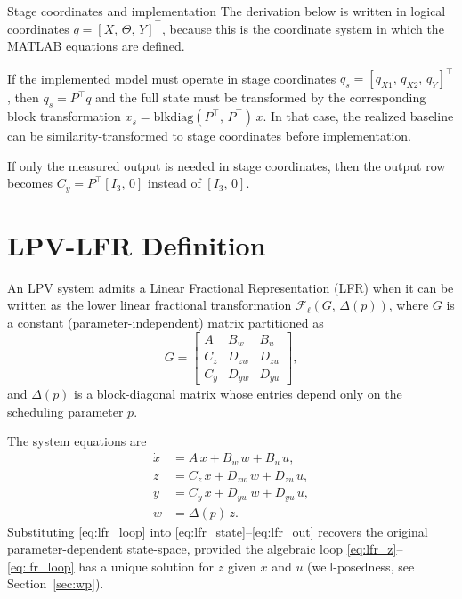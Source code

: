 \documentclass[11pt]{article}
\begin{document}
\begin{notebox}{Stage coordinates and implementation}
The derivation below is written in logical coordinates
$q = [X,\,\Theta,\,Y]^\top$, because this is the coordinate system in which the
MATLAB equations are defined.

If the implemented model must operate in stage coordinates
$q_s = [q_{X1},\,q_{X2},\,q_Y]^\top$, then $q_s = P^\top q$ and the full state
must be transformed by the corresponding block transformation
$x_s = \mathrm{blkdiag}(P^\top,\,P^\top)\,x$.
In that case, the realized baseline can be similarity-transformed to stage
coordinates before implementation.

If only the measured output is needed in stage coordinates, then the output row
becomes $C_y = P^\top [I_3,\,0]$ instead of $[I_3,\,0]$.
\end{notebox}

\section{LPV-LFR Definition}

An LPV system admits a Linear Fractional Representation (LFR)
when it can be written as the lower linear fractional transformation
$\mathcal{F}_\ell(G,\,\Delta(p))$,
where $G$ is a constant (parameter-independent) matrix partitioned as
\begin{equation}
    G = \begin{bmatrix}
        A   & B_w   & B_u \\
        C_z & D_{zw} & D_{zu} \\
        C_y & D_{yw} & D_{yu}
    \end{bmatrix},
    \label{eq:Gmat}
\end{equation}
and $\Delta(p)$ is a block-diagonal matrix whose entries depend only on the
scheduling parameter $p$.

The system equations are
\begin{align}
    \dot{x} &= A\,x + B_w\,w + B_u\,u, \label{eq:lfr_state}\\
    z       &= C_z\,x + D_{zw}\,w + D_{zu}\,u, \label{eq:lfr_z}\\
    y       &= C_y\,x + D_{yw}\,w + D_{yu}\,u, \label{eq:lfr_out}\\
    w       &= \Delta(p)\,z. \label{eq:lfr_loop}
\end{align}
Substituting \eqref{eq:lfr_loop} into \eqref{eq:lfr_state}--\eqref{eq:lfr_out} recovers the
original parameter-dependent state-space, provided the algebraic loop
\eqref{eq:lfr_z}--\eqref{eq:lfr_loop} has a unique solution for $z$ given $x$ and $u$
(well-posedness, see Section~\ref{sec:wp}).
\end{document}
